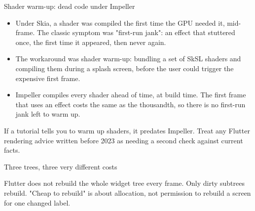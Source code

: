\documentclass[10pt,aspectratio=169,t]{beamer}
\begin{document}
\begin{frame}[eyebrow=Rendering]{Shader warm-up: dead code under Impeller}
  \begin{itemize}
    \item Under Skia, a shader was compiled the first time the GPU needed it, mid-frame. The classic symptom was "first-run jank": an effect that stuttered once, the first time it appeared, then never again.
    \item The workaround was shader warm-up: bundling a set of SkSL shaders and compiling them during a splash screen, before the user could trigger the expensive first frame.
    \item Impeller compiles every shader ahead of time, at build time. The first frame that uses an effect costs the same as the thousandth, so there is no first-run jank left to warm up.
  \end{itemize}
  \begin{takeaway}{If a tutorial tells you to warm up shaders, it predates Impeller.}
    Treat any Flutter rendering advice written before 2023 as needing a second check against current facts.
  \end{takeaway}
\end{frame}

\begin{frame}[eyebrow=Rendering]{Three trees, three very different costs}
  \vskip 3mm
  \begin{grid}[3]
  \end{grid}
  \begin{takeaway}{Flutter does not rebuild the whole widget tree every frame.}
    Only dirty subtrees rebuild. "Cheap to rebuild" is about allocation, not permission to rebuild a screen for one changed label.
  \end{takeaway}
\end{frame}
\end{document}
